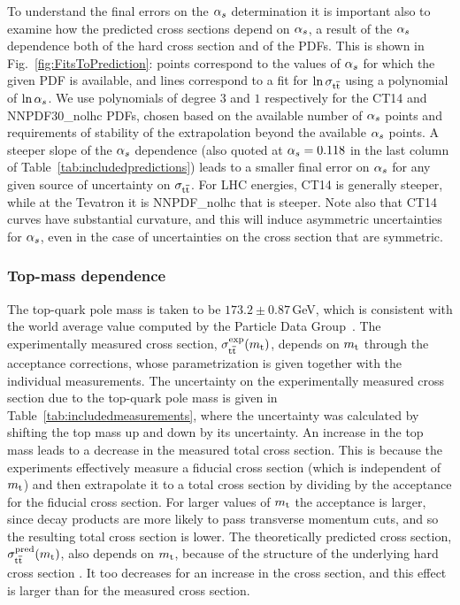 To understand the final errors on the $\alpha_s$ determination it is
important also to examine how the predicted cross sections depend on
$\alpha_s$, a result of the $\alpha_s$ dependence both of the hard cross section
and of the PDFs.
%
This is shown in Fig.~\ref{fig:FitsToPrediction}: points correspond
to the values of $\alpha_s$ for which the given PDF is available, and lines
correspond to a fit for $\ln \sigma_{\mathrm{t}\overline{\mathrm{t}}}$ using a polynomial of $\ln \alpha_s$. 
%
We use polynomials of degree $3$ and $1$ respectively for the CT14 and
NNPDF30\_nolhc PDFs, chosen based on the available number of $\alpha_s$ points and
requirements of stability of the extrapolation beyond the available
$\alpha_s$ points.
%
A steeper slope of the $\alpha_s$ dependence (also quoted at $\alpha_s=0.118$ in
the last column of Table~\ref{tab:includedpredictions})
leads to a smaller final error on $\alpha_s$ for any given source of
uncertainty on $\sigma_{\mathrm{t}\overline{\mathrm{t}}}$. 
%
For LHC energies, CT14 is generally steeper, while at the Tevatron
it is NNPDF\_nolhc that is steeper.
%
Note also that CT14 curves have substantial curvature, and this will
induce asymmetric uncertainties for $\alpha_s$, even in the case of
uncertainties on the cross section that are symmetric.



\subsubsection{Top-mass dependence}
\label{sec:top-mass-dependence}

The top-quark pole mass is taken to be $173.2 \pm 0.87\,$GeV, which
is consistent with the world average value computed by the Particle Data
Group~\cite{pdg}. 
% 
% 
The experimentally measured cross section, $\sigma_{\mathrm{t}\overline{\mathrm{t}}}^{\text{exp}} (m_{\mathrm{t}})$,
depends on $m_{\mathrm{t}}$ through the acceptance corrections, whose
parametrization is given together with the individual
measurements.
% 
The uncertainty on the experimentally measured cross section due to the top-quark pole mass is given in Table~\ref{tab:includedmeasurements}, where the uncertainty was calculated by shifting the top mass up and down by its uncertainty.
% 
An increase in the top mass leads to a decrease in the measured total
cross section.
%
This is because the experiments effectively measure a fiducial cross
section (which is independent of $m_{\mathrm{t}}$) and then extrapolate it to a
total cross section by dividing by the acceptance for the fiducial
cross section.
%
For larger values of $m_{\mathrm{t}}$ the acceptance is larger, since decay
products are more likely to pass transverse momentum cuts, and so the resulting
total cross section is lower.
% 
The theoretically predicted cross section,
$\sigma_{\mathrm{t}\overline{\mathrm{t}}}^{\text{pred}} ( m_{\mathrm{t}} )$, also depends on $m_{\mathrm{t}}$, because of the
structure of the underlying hard cross section%
.
%
It too decreases for an increase in the cross section, and this
effect is larger than for the measured cross section.

